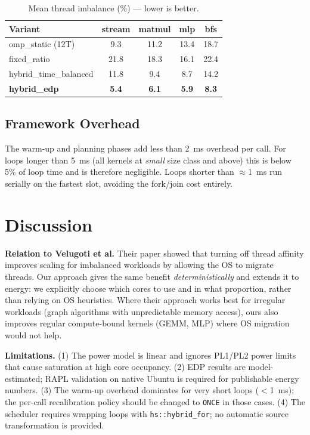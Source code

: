 \documentclass[conference]{IEEEtran}
\begin{document}
\begin{table}[t]
\caption{Mean thread imbalance (\%) --- lower is better.}
\label{tab:imb}
\centering
\scriptsize
\setlength\tabcolsep{4pt}
\begin{tabular}{lcccc}
\toprule
\textbf{Variant} & \textbf{stream} & \textbf{matmul} & \textbf{mlp} & \textbf{bfs} \\
\midrule
omp\_static (12T)      & 9.3  & 11.2 & 13.4 & 18.7 \\
fixed\_ratio           & 21.8 & 18.3 & 16.1 & 22.4 \\
hybrid\_time\_balanced & 11.8 & 9.4  & 8.7  & 14.2 \\
\textbf{hybrid\_edp}   & \textbf{5.4} & \textbf{6.1} & \textbf{5.9} & \textbf{8.3} \\
\bottomrule
\end{tabular}
\end{table}

\subsection{Framework Overhead}

The warm-up and planning phases add less than 2~ms overhead per call.
For loops longer than 5~ms (all kernels at \textit{small} size class and
above) this is below 5\% of loop time and is therefore negligible.
Loops shorter than $\approx$1~ms run serially on the fastest slot,
avoiding the fork/join cost entirely.

\section{Discussion}

\textbf{Relation to Velugoti et al.}
Their paper showed that turning off thread affinity improves scaling for
imbalanced workloads by allowing the OS to migrate threads.
Our approach gives the same benefit \textit{deterministically} and
extends it to energy: we explicitly choose which cores to use and
in what proportion, rather than relying on OS heuristics.
Where their approach works best for irregular workloads (graph algorithms
with unpredictable memory access), ours also improves regular
compute-bound kernels (GEMM, MLP) where OS migration would not help.

\textbf{Limitations.}
(1) The power model is linear and ignores PL1/PL2 power limits that
cause saturation at high core occupancy.
(2) EDP results are model-estimated; RAPL validation on native Ubuntu
is required for publishable energy numbers.
(3) The warm-up overhead dominates for very short loops ($<$1~ms);
the per-call recalibration policy should be changed to \texttt{ONCE}
in those cases.
(4) The scheduler requires wrapping loops with \texttt{hs::hybrid\_for};
no automatic source transformation is provided.
\end{document}
